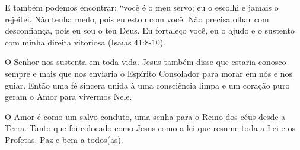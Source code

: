 \emdash{}E também podemos encontrar: ``você é o meu servo; eu o escolhi e jamais o rejeitei. Não tenha medo, pois eu estou com você. Não precisa olhar com desconfiança, pois eu sou o teu Deus. Eu fortaleço você, eu o ajudo e o sustento com minha direita vitoriosa (Isaías 41:8-10). 

\emdash{}O Senhor nos sustenta em toda vida. Jesus também disse que estaria conosco sempre e mais que nos enviaria o Espírito Consolador para morar em nós e nos guiar. Então uma fé sincera unida à uma consciência limpa e um coração puro geram o Amor para vivermos Nele.

\emdash{}O Amor é como um salvo-conduto, uma senha para o Reino dos céus desde a Terra. Tanto que foi colocado como Jesus como a lei que resume toda a Lei e os Profetas. Paz e bem a todos(as).
